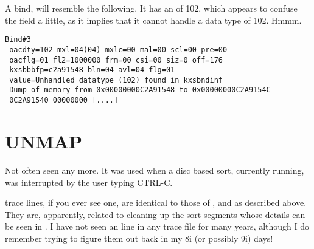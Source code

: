 \label{ref-cursor-102}A  bind, will resemble the following. It has an  of 102, which appears to confuse the  field a little, as it implies that it cannot handle a data type of 102. Hmmm.

\begin{lstlisting}[numbers=none,caption={Bind Example - REF\_CURSOR}]
Bind#3
 oacdty=102 mxl=04(04) mxlc=00 mal=00 scl=00 pre=00
 oacflg=01 fl2=1000000 frm=00 csi=00 siz=0 off=176
 kxsbbbfp=c2a91548 bln=04 avl=04 flg=01
 value=Unhandled datatype (102) found in kxsbndinf
 Dump of memory from 0x00000000C2A91548 to 0x00000000C2A9154C
 0C2A91540 00000000 [....]
\end{lstlisting}

\newpage\section{UNMAP}\label{unmap}

Not often seen any more. It was used when a disc based sort, currently running, was interrupted by the user typing CTRL-C.

 trace lines, if you ever see one, are identical to those of ,  and  as described above. They are, apparently, related to cleaning up the sort segments whose details can be seen in . I have not seen an  line in any trace file for many years, although I do remember trying to figure them out back in my 8i (or possibly 9i) days!

